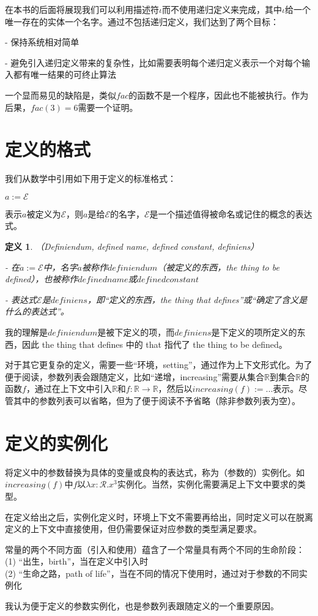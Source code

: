 \documentclass[UTF8]{article}
\newtheorem{thm}{定义}[section]
\begin{document}
		在本书的后面将展现我们可以利用描述符$\iota$而不使用递归定义来完成，其中$\iota$给一个唯一存在的实体一个名字。通过不包括递归定义，我们达到了两个目标：
		
		\noindent
		- 保持系统相对简单
		
		\noindent
		- 避免引入递归定义带来的复杂性，比如需要表明每个递归定义表示一个对每个输入都有唯一结果的可终止算法
		
		一个显而易见的缺陷是，类似$fac$的函数不是一个程序，因此也不能被执行。作为后果，$fac(3)=6$需要一个证明。
		
	\section{定义的格式}
	\noindent
	我们从数学中引用如下用于定义的标准格式：
		
		$a:=\mathcal{E}$
		
		表示$a$被定义为$\mathcal{E}$，则$a$是给$\mathcal{E}$的名字，$\mathcal{E}$是一个描述值得被命名或记住的概念的表达式。
		
		\begin{thm}（Definiendum, defined name, defined constant, definiens）
			
			- 在$a:=\mathcal{E}$中，名字$a$被称作$definiendum$（被定义的东西，the thing to be defined），也被称作$defined name$或$defined constant$
			
			- 表达式$\mathcal{E}$是$definiens$，即“定义的东西，the thing that defines”或“确定了含义是什么的表达式”。
		\end{thm}
	
		我的理解是$definiendum$是被下定义的项，而$definiens$是下定义的项所定义的东西，因此 the thing that defines 中的 that 指代了 the thing to be defined。
		
		对于其它更复杂的定义，需要一些“环境，setting”，通过作为上下文形式化。为了便于阅读，参数列表会跟随定义，比如“递增，increasing”需要从集合$\mathbb{R}$到集合$\mathbb{R}$的函数$f$，通过在上下文中引入$\mathbb{R}$和$f:\mathbb{R}\rightarrow\mathbb{R}$，然后以$increasing(f) := ...$表示。尽管其中的参数列表可以省略，但为了便于阅读不予省略（除非参数列表为空）。
		
	\section{定义的实例化}
	\noindent
	将定义中的参数替换为具体的变量或良构的表达式，称为（参数的）实例化。如$increasing(f)$中$f$以$\lambda x:\mathcal{R}.x^3$实例化。当然，实例化需要满足上下文中要求的类型。
	
		在定义给出之后，实例化定义时，环境上下文不需要再给出，同时定义可以在脱离定义的上下文中直接使用，但仍需要保证对应参数的类型满足要求。
		
		常量的两个不同方面（引入和使用）蕴含了一个常量具有两个不同的生命阶段：\\
		(1) “出生，birth”，当在定义中引入时\\
		(2) “生命之路，path of life”，当在不同的情况下使用时，通过对于参数的不同实例化
		
		我认为便于定义的参数实例化，也是参数列表跟随定义的一个重要原因。
\end{document}
